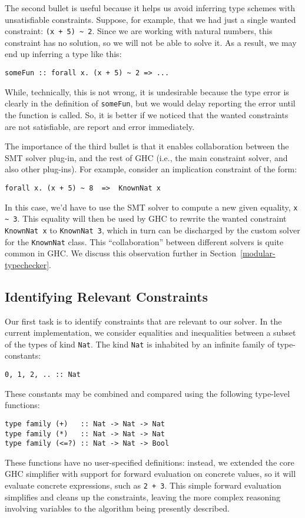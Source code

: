\documentclass{sigplanconf}
\begin{document}
The second bullet is useful because it helps us avoid inferring type
schemes with unsatisfiable constraints.  Suppose, for example, that
we had just a single wanted constraint: \Verb"(x + 5) ~ 2".  Since we
are working with natural numbers, this constraint has no solution, so
we will not be able to solve it. As a result, we may end up inferring
a type like this:
\begin{Verbatim}
someFun :: forall x. (x + 5) ~ 2 => ...
\end{Verbatim}
While, technically, this is not wrong, it is undesirable because the type
error is clearly in the definition of \Verb"someFun", but we would delay
reporting the error until the function is called.  So, it is better if
we noticed that the wanted constraints are not satisfiable, are report
and error immediately.

The importance of the third bullet is that it enables collaboration between
the SMT solver plug-in, and the rest of GHC (i.e., the main constraint solver,
and also other plug-ins).  For example, consider an implication constraint
of the form:
\begin{Verbatim}
forall x. (x + 5) ~ 8  =>  KnownNat x
\end{Verbatim}
In this case, we'd have to use the SMT solver to compute a new given
equality, \Verb"x ~ 3".  This equality will then be used by GHC to
rewrite the wanted constraint \Verb"KnownNat x" to \Verb"KnownNat 3",
which in turn can be discharged by the custom solver for the \Verb"KnownNat"
class.  This ``collaboration'' between different solvers is quite common
in GHC.
We discuss this observation further in Section~\ref{modular-typechecker}.


\subsection{Identifying Relevant Constraints}
Our first task is to identify constraints that are relevant to our solver.
In the current implementation, we consider equalities and inequalities
between a subset of the types of kind \Verb"Nat".   The kind \Verb"Nat" is
inhabited by an infinite family of type-constants:
\begin{Verbatim}
0, 1, 2, .. :: Nat
\end{Verbatim}
These constants may be combined and compared using the following
type-level functions:
\begin{Verbatim}
type family (+)   :: Nat -> Nat -> Nat
type family (*)   :: Nat -> Nat -> Nat
type family (<=?) :: Nat -> Nat -> Bool
\end{Verbatim}
These functions have no user-specified definitions: instead, we extended
the core GHC simplifier with support for forward evaluation on concrete
values, so it will evaluate concrete expressions, such as \Verb"2 + 3".
This simple forward evaluation simplifies and cleans up the constraints,
leaving the more complex reasoning involving variables to the algorithm
being presently described.
\end{document}
